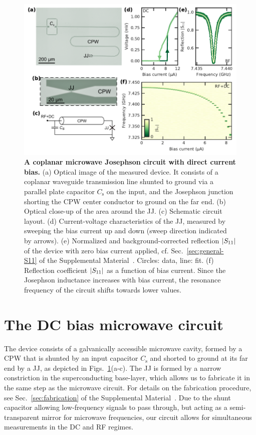 \begin{figure}[t]
	\centering
	\includegraphics[width=\linewidth]{chapter-currentdetection/figures/Figure1}
	\caption{
		\textbf{A coplanar microwave Josephson circuit with direct current bias.}
		(a) Optical image of the measured device.
		It consists of a coplanar waveguide transmission line shunted to ground via a parallel plate capacitor $C_\text{s}$ on the input, and the Josephson junction shorting the CPW center conductor to ground on the far end.
		(b) Optical close-up of the area around the JJ.
		(c) Schematic circuit layout.
		(d) Current-voltage characteristics of the JJ, measured by sweeping the bias current up and down (sweep direction indicated by arrows).
		(e) Normalized and background-corrected reflection $\lvert S_{11}\rvert$ of the device with zero bias current applied, cf. Sec.~\ref{sec:general-S11} of the Supplemental Material~\cite{SeeSupplementalMaterial}.
		Circles: data, line: fit.
		(f) Reflection coefficient $\lvert S_{11}\rvert$ as a function of bias current.
		Since the Josephson inductance increases with bias current, the resonance frequency of the circuit shifts towards lower values.
		\label{fig:figure1}
	}
\end{figure}

\section{The DC bias microwave circuit}

The device consists of a galvanically accessible microwave cavity, formed by a CPW that is shunted by an input capacitor $C_\text{s}$ and shorted to ground at its far end by a JJ, as depicted in Figs.~\ref{fig:figure1}(a-c).
% 
The JJ is formed by a narrow constriction in the superconducting base-layer, which allows us to fabricate it in the same step as the microwave circuit.
% 
For details on the fabrication procedure, see Sec.~\ref{sec:fabrication} of the Supplemental Material~\cite{SeeSupplementalMaterial}.
% 
Due to the shunt capacitor allowing low-frequency signals to pass through, but acting as a semi-transparent mirror for microwave frequencies, our circuit allows for simultaneous measurements in the DC and RF regimes.

